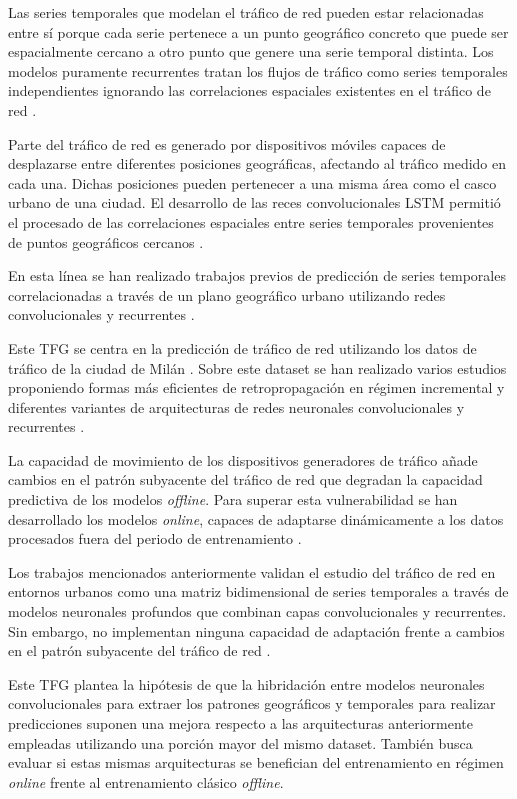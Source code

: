 Las series temporales que modelan el tráfico de red pueden estar relacionadas entre sí porque cada serie pertenece a un punto geográfico concreto que puede ser espacialmente cercano a otro punto que genere una serie temporal distinta. Los modelos puramente recurrentes tratan los flujos de tráfico como series temporales independientes ignorando las correlaciones espaciales existentes en el tráfico de red \cite{lstm,lstm2}.

Parte del tráfico de red es generado por dispositivos móviles capaces de desplazarse entre diferentes posiciones geográficas, afectando al tráfico medido en cada una. Dichas posiciones pueden pertenecer a una misma área como el casco urbano de una ciudad. El desarrollo de las reces convolucionales LSTM permitió el procesado de las correlaciones espaciales entre series temporales provenientes de puntos geográficos cercanos \cite{shi2015}.

En esta línea se han realizado trabajos previos de predicción de series temporales correlacionadas a través de un plano geográfico urbano utilizando redes convolucionales y recurrentes \cite{shi2015,zhang2018,zhou2022,shen2023,he2024}.

Este TFG se centra en la predicción de tráfico de red utilizando los datos de tráfico de la ciudad de Milán \cite{milandataset}. Sobre este dataset se han realizado varios estudios proponiendo formas más eficientes de retropropagación en régimen incremental \cite{SKIMAcasaseca} y diferentes variantes de arquitecturas de redes neuronales convolucionales y recurrentes \cite{zhang2018,shen2023,he2024,tfgalicia}. 

La capacidad de movimiento de los dispositivos generadores de tráfico añade cambios en el patrón subyacente del tráfico de red que degradan la capacidad predictiva de los modelos \textit{offline}. Para superar esta vulnerabilidad se han desarrollado los modelos \textit{online}, capaces de adaptarse dinámicamente a los datos procesados fuera del periodo de entrenamiento \cite{conceptdrift,conceptdrift1,conceptdrift2}.

Los trabajos mencionados anteriormente validan el estudio del tráfico de red en entornos urbanos como una matriz bidimensional de series temporales a través de modelos neuronales profundos que combinan capas convolucionales y recurrentes. Sin embargo, no implementan ninguna capacidad de adaptación frente a cambios en el patrón subyacente del tráfico de red \cite{shi2015,zhang2018,zhou2022,shen2023,he2024,tfgalicia}.

Este TFG plantea la hipótesis de que la hibridación entre modelos neuronales convolucionales para extraer los patrones geográficos y temporales para realizar predicciones suponen una mejora respecto a las arquitecturas anteriormente empleadas utilizando una porción mayor del mismo dataset. También busca evaluar si estas mismas arquitecturas se benefician del entrenamiento en régimen \textit{online} frente al entrenamiento clásico \textit{offline}.